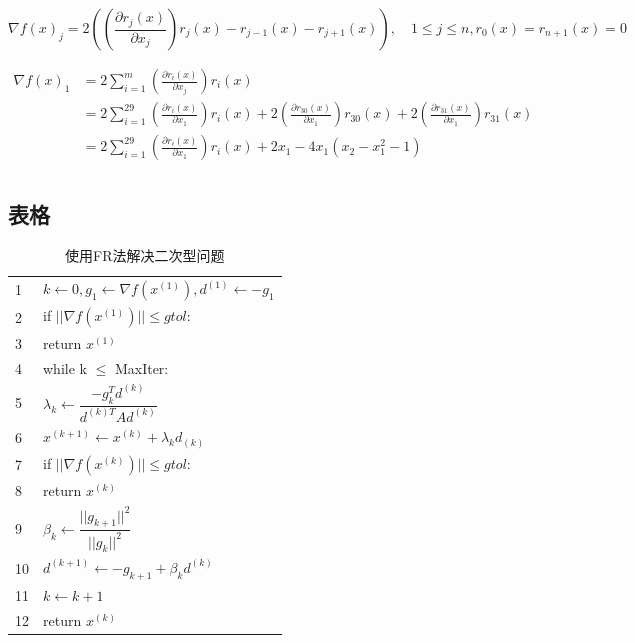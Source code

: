 \documentclass{zjgsureport}
\begin{document}
\begin{equation*}
    \nabla f(x)_j=
    2((\frac{\partial r_j(x)}{\partial x_j})r_j(x)-r_{j-1}(x)-r_{j+1}(x))
    ,\quad 1\leq j \leq n,r_0(x)=r_{n+1}(x)=0
\end{equation*}

\begin{equation*}
\begin{aligned}
\nabla f(x)_1&=2 \sum\limits_{i=1}^m (\frac{\partial r_i(x)}{\partial x_j})r_i(x)\\
&=2 \sum\limits_{i=1}^{29} (\frac{\partial r_i(x)}{\partial x_1})r_i(x)+2(\frac{\partial r_{30}(x)}{\partial x_1})r_{30}(x)+2(\frac{\partial r_{31}(x)}{\partial x_1})r_{31}(x)\\
&=2 \sum\limits_{i=1}^{29} (\frac{\partial r_i(x)}{\partial x_1})r_i(x)+2x_1-4x_1(x_2-x_1^2-1)\\
\end{aligned}
\end{equation*}


\newpage

\subsection{表格} 

\begin{table}[htp]
\caption{使用FR法解决二次型问题}\label{tab:FRCG}
\begin{center}
	\begin{tabular}{l|l}
	\hline
	1 &$k\leftarrow0,g_1\leftarrow\nabla f(x^{(1)}),d^{(1)}\leftarrow-g_1$\\ 
	2 &if $||\nabla f(x^{(1)})||\leq gtol$:\\ 
	3 &\quad return $x^{(1)}$ \\ 
	4 &while k $\leq$ MaxIter:\\ 
	5 &\quad $\lambda_k\leftarrow\dfrac{-g_k^T d^{(k)}}{d^{(k)T}Ad^{(k)}}$ \\
	6 &\quad $x^{(k+1)}\leftarrow x^{(k)}+\lambda_k d_{(k)}$ \\ 
	7 &\quad if $||\nabla f(x^{(k)})||\leq gtol$: \\ 
	8 &\quad \quad return $x^{(k)}$ \\ 
	9 &\quad $\beta_k\leftarrow\dfrac{||g_{k+1}||^2}{||g_k||^2}$ \\
	10 &\quad $d^{(k+1)}\leftarrow-g_{k+1}+\beta_kd^{(k)}$ \\ 
	11 &\quad $k\leftarrow k+1$ \\ 
	12 &return $x^{(k)}$\\ \hline
	\end{tabular}
\end{center}
\end{table}
\end{document}
